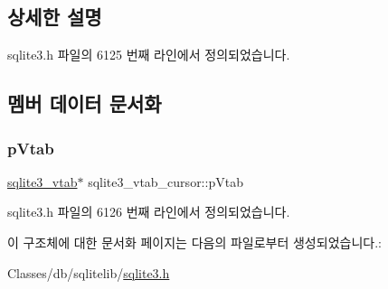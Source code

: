 \subsection{상세한 설명}


sqlite3.\+h 파일의 6125 번째 라인에서 정의되었습니다.



\subsection{멤버 데이터 문서화}
\mbox{\label{structsqlite3__vtab__cursor_a2989d9f84a35506c3ef9fe9e9ecd3365}} 
\subsubsection{\texorpdfstring{p\+Vtab}{pVtab}}
{\footnotesize\ttfamily \hyperlink{structsqlite3__vtab}{sqlite3\+\_\+vtab}$\ast$ sqlite3\+\_\+vtab\+\_\+cursor\+::p\+Vtab}



sqlite3.\+h 파일의 6126 번째 라인에서 정의되었습니다.



이 구조체에 대한 문서화 페이지는 다음의 파일로부터 생성되었습니다.\+:\begin{DoxyCompactItemize}
\item 
Classes/db/sqlitelib/\hyperlink{sqlite3_8h}{sqlite3.\+h}\end{DoxyCompactItemize}
